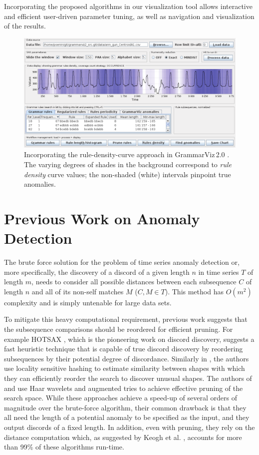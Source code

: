\documentclass{sig-alternate}
\begin{document}
Incorporating the proposed algorithms in our visualization tool allows interactive and efficient user-driven parameter tuning, as well as navigation and visualization of the results.

\begin{figure}[t]
   \centering
   \includegraphics[width=\textwidth]{VideoData.pdf}
   \caption{Incorporating the rule-density-curve approach in GrammarViz\,2.0 \cite{grammarviz2}. The varying degrees of shades in the background correspond to \textit{rule density} curve values; the non-shaded (white) intervals pinpoint true anomalies.}
   \label{fig:app}
\end{figure}

\section{Previous Work on Anomaly\\ Detection}
The brute force solution for the problem of time series anomaly detection or, more specifically, the discovery of a discord of a given length $n$ in time series $T$ of length $m$, needs to consider all possible distances between each subsequence $C$ of length $n$ and all of its non-self matches $M$ ($C,M \in T$). This method has $O(m^{2})$ complexity and is simply untenable for large data sets. 

To mitigate this heavy computational requirement, previous work suggests that the subsequence comparisons should be reordered for efficient pruning. For example HOTSAX \cite{hot_sax}, which is the pioneering work on discord discovery, suggests a fast heuristic technique that is capable of true discord discovery by reordering subsequences by their potential degree of discordance. Similarly in \cite{hashing}, the authors use locality sensitive hashing to estimate similarity between shapes with which they can efficiently reorder the search to discover unusual shapes. The authors of \cite{haar_1} and \cite{haar_2} use Haar wavelets and augmented tries to achieve effective pruning of the search space. While these approaches achieve a speed-up of several orders of magnitude over the brute-force algorithm, their common drawback is that they all need the length of a potential anomaly to be specified as the input, and they output discords of a fixed length. In addition, even with pruning, they rely on the distance computation which, as suggested by Keogh et al. \cite{hot_sax}, accounts for more than 99\% of these algorithms run-time.  
\end{document}

